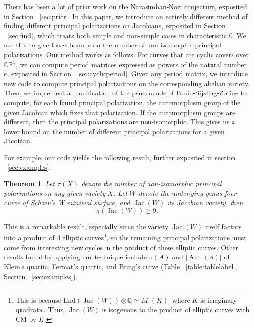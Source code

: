 \documentclass[12pt,reqno]{amsart}
\DeclareMathOperator{\Aut}{Aut}
\DeclareMathOperator{\Jac}{Jac}
\newcommand{\C}{\mathbb{C}}
\newcommand{\Q}{\mathbb{Q}}
\newcommand{\bb}{\mathbb}
\renewcommand{\P}{\mathbb{P}}
\newtheorem{theorem}{Theorem}
\theoremstyle{definition}
\theoremstyle{remark}
\begin{document}
There has been a lot of prior work on the Narasimhan-Nori conjecture, exposited in Section ~\ref{sec:prior}. In this paper, we introduce an entirely different method of finding different principal polarizations on Jacobians, exposited in Section ~\ref{sec:find}, which treats both simple and non-simple cases in characteristic 0. We use this to give lower bounds on the number of non-isomorphic principal polarizations. Our method works as follows. For curves that are cyclic covers over $\C\bb{P}^1$, we can compute period matrices expressed as powers of the natural number $e$, exposited in Section ~\ref{sec:cyclicperiod}. Given any period matrix, we introduce new code to compute principal polarizations on the corresponding abelian variety. Then, we implement a modification of the psuedocode of Bruin-Sijsling-Zotine \cite{numerical} to compute, for each found principal polarization, the automorphism group of the given Jacobian which fixes that polarization. If the automorphism groups are different, then the principal polarizations are non-isomorphic. This gives us a lower bound on the number of different principal polarizations for a given Jacobian. 

For example, our code yields the following result, further exposited in section ~\ref{sec:examples}. 

\begin{theorem} \label{IWP} Let $\pi(X)$ denote the number of non-isomorphic principal polarizations on any given variety $X$. Let $W$ denote the underlying genus four curve of Schoen's W minimal surface, and $\Jac(W)$ its Jacobian variety, then $$\pi(\Jac(W)) \geq 9.$$\end{theorem}

This is a remarkable result, especially since the variety $\Jac(W)$ itself factors into a product of 4 elliptic curves\footnote{This is because $\text{End}(\Jac(W)) \otimes \Q \simeq M_4(K)$, where $K$ is imaginary quadratic. Thus, $\Jac(W)$ is isogenous to the product of elliptic curves with CM by $K$.}, so the remaining principal polarizations must come from interesting new cycles in the product of these elliptic curves. Other results found by applying our technique include $\pi(A)$ and $|\Aut(A)|$ of Klein's quartic, Fermat's quartic, and Bring's curve (Table ~\ref{table:tablelabel}, Section ~\ref{sec:examples}).
\end{document}
